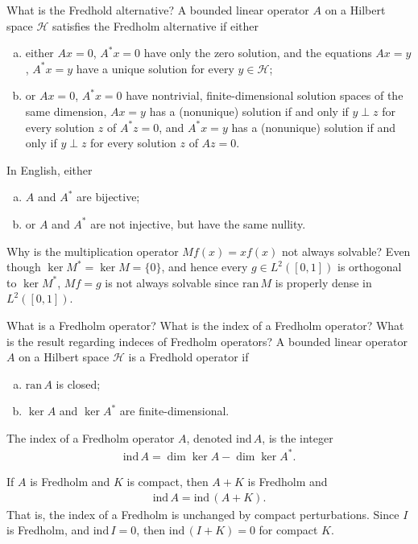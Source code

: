 \documentclass[avery5388,grid,frame]{flashcards}
\newcommand{\ran}{\mathrm{ran}\,}
\newcommand{\ind}{\mathrm{ind}\,}
\def\hilb{\mathcal{H}}
\begin{document}
\begin{flashcard}
    {What is the Fredhold alternative?}
    A bounded linear operator $A$ on a Hilbert space $\hilb$ satisfies the Fredholm alternative if either
    \begin{enumerate}[(a)]
        \item either $Ax = 0$, $A^*x = 0$ have only the zero solution, and the equations $Ax = y$, $A^*x = y$ have a unique solution for every $y \in \hilb$;
        \item or $Ax = 0$, $A^*x = 0$ have nontrivial, finite-dimensional solution spaces of the same dimension, $Ax = y$ has a (nonunique) solution if and only if $y \perp z$ for every solution $z$ of $A^*z = 0$, and $A^*x = y$ has a (nonunique) solution if and only if $y \perp z$ for every solution $z$ of $Az = 0$.
    \end{enumerate}
    In English, either
    \begin{enumerate}[(a)]
        \item $A$ and $A^*$ are bijective;
        \item or $A$ and $A^*$ are not injective, but have the same nullity.
    \end{enumerate}
\end{flashcard}

\begin{flashcard}
    {Why is the multiplication operator $Mf(x) = xf(x)$ not always solvable?}
    Even though $\ker M^* = \ker M = \{0\}$, and hence every $g \in L^2([0,1])$ is orthogonal to $\ker M^*$, $Mf = g$ is not always solvable since $\ran M$ is properly dense in $L^2([0,1])$.
\end{flashcard}

\begin{flashcard}
    {What is a Fredholm operator?  What is the index of a Fredholm operator?  What is the result regarding indeces of Fredholm operators?}
    A bounded linear operator $A$ on a Hilbert space $\hilb$ is a Fredhold operator if
    \begin{enumerate}[(a)]
        \item $\ran A$ is closed;
        \item $\ker A$ and $\ker A^*$ are finite-dimensional.
    \end{enumerate}

    The index of a Fredholm operator $A$, denoted $\ind A$, is the integer
    \begin{align*}
        \ind A = \dim \ker A - \dim \ker A^*.
    \end{align*}

    If $A$ is Fredholm and $K$ is compact, then $A + K$ is Fredholm and
    \begin{align*}
        \ind A = \ind (A + K).
    \end{align*}
    That is, the index of a Fredholm is unchanged by compact perturbations.  Since $I$ is Fredholm, and $\ind I = 0$, then $\ind (I + K) = 0$ for compact $K$.
\end{flashcard}
\end{document}
